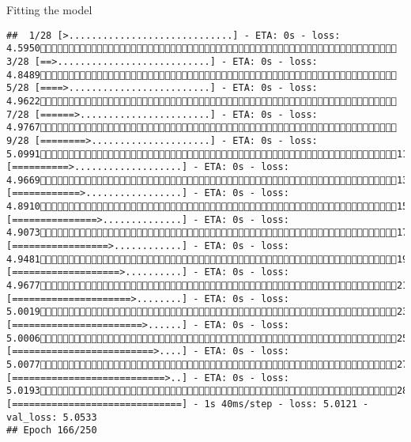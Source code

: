 \documentclass[
  ignorenonframetext,
]{beamer}
\begin{document}
\begin{frame}[fragile]{Fitting the model}
\begin{verbatim}
##  1/28 [>.............................] - ETA: 0s - loss: 4.5950 3/28 [==>...........................] - ETA: 0s - loss: 4.8489 5/28 [====>.........................] - ETA: 0s - loss: 4.9622 7/28 [======>.......................] - ETA: 0s - loss: 4.9767 9/28 [========>.....................] - ETA: 0s - loss: 5.099111/28 [==========>...................] - ETA: 0s - loss: 4.966913/28 [============>.................] - ETA: 0s - loss: 4.891015/28 [===============>..............] - ETA: 0s - loss: 4.907317/28 [=================>............] - ETA: 0s - loss: 4.948119/28 [===================>..........] - ETA: 0s - loss: 4.967721/28 [=====================>........] - ETA: 0s - loss: 5.001923/28 [=======================>......] - ETA: 0s - loss: 5.000625/28 [=========================>....] - ETA: 0s - loss: 5.007727/28 [===========================>..] - ETA: 0s - loss: 5.019328/28 [==============================] - 1s 40ms/step - loss: 5.0121 - val_loss: 5.0533
## Epoch 166/250

\end{verbatim}
\end{frame}
\end{document}
